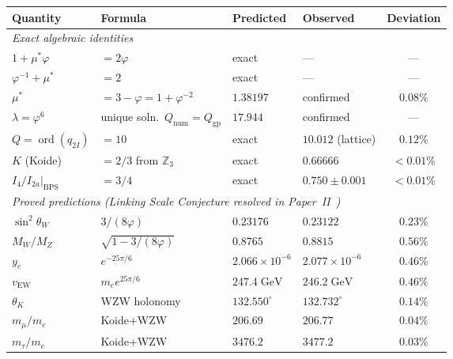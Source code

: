 \documentclass[11pt,a4paper]{article}
\theoremstyle{definition}
\theoremstyle{remark}
\newcommand{\vp}{\varphi}
\newcommand{\ms}{\mu^{*}}
\newcommand{\lam}{\lambda}
\newcommand{\sinW}{\sin^{2}\!\theta_{W}}
\newcommand{\vEW}{v_{\mathrm{EW}}}
\newcommand{\ord}{\operatorname{ord}}
\begin{document}
\begin{center}
\renewcommand{\arraystretch}{1.3}
\begin{tabular}{p{4cm}p{5cm}p{1.5cm}p{1.5cm}c}
\toprule
Quantity & Formula & Predicted & Observed & Deviation \\
\midrule
\multicolumn{5}{l}{\textit{Exact algebraic identities}} \\
$1+\ms\vp$ & $= 2\vp$ & exact & --- & --- \\
$\vp^{-1}+\ms$ & $= 2$ & exact & --- & --- \\
$\ms$ & $= 3-\vp = 1+\vp^{-2}$ & $1.38197$ & confirmed & $0.08\%$ \\
$\lam=\vp^6$ & unique soln.\ $Q_\mathrm{num}=Q_\mathrm{gp}$ & $17.944$ & confirmed & --- \\
$Q=\ord(q_{2I})$ & $= 10$ & exact & $10.012$ (lattice) & $0.12\%$ \\
$K$ (Koide) & $= 2/3$ from $\mathbb{Z}_3$ & exact & $0.66666$ & $<0.01\%$ \\
$I_4/I_{2a}|_{\mathrm{BPS}}$ & $= 3/4$ & exact & $0.750\pm0.001$ & $<0.01\%$ \\[4pt]
\multicolumn{5}{l}{\textit{Proved predictions (Linking Scale Conjecture resolved in Paper~II~\cite{Paper2})}} \\
$\sinW$ & $3/(8\vp)$ & $0.23176$ & $0.23122$ & $0.23\%$ \\
$M_W/M_Z$ & $\sqrt{1-3/(8\vp)}$ & $0.8765$ & $0.8815$ & $0.56\%$ \\
$y_e$ & $e^{-25\pi/6}$ & $2.066\times10^{-6}$ & $2.077\times10^{-6}$ & $0.46\%$ \\
$\vEW$ & $m_e e^{25\pi/6}$ & $247.4\;\text{GeV}$ & $246.2\;\text{GeV}$ & $0.46\%$ \\
$\theta_K$ & WZW holonomy & $132.550^\circ$ & $132.732^\circ$ & $0.14\%$ \\
$m_\mu/m_e$ & Koide+WZW & $206.69$ & $206.77$ & $0.04\%$ \\
$m_\tau/m_e$ & Koide+WZW & $3476.2$ & $3477.2$ & $0.03\%$ \\
\bottomrule
\end{tabular}
\smallskip
\end{center}

\bigskip
\end{document}
